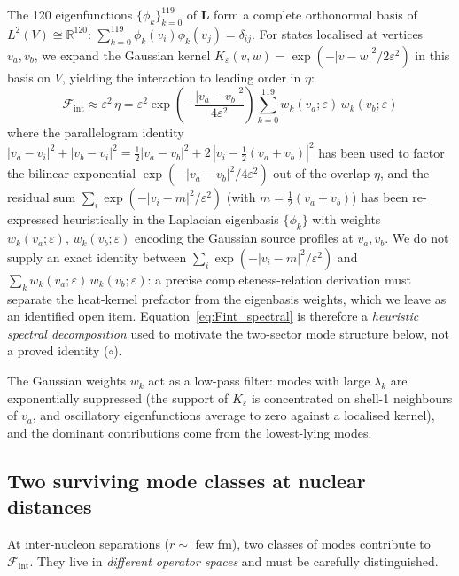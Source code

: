 \documentclass[12pt]{article}
\newcommand{\Fcal}{\mathcal{F}}
\newcommand{\Fint}{\Fcal_{\mathrm{int}}}
\begin{document}
The 120 eigenfunctions $\{\phi_k\}_{k=0}^{119}$ of $\mathbf{L}$ form a
complete orthonormal basis of $L^2(V) \cong \mathbb{R}^{120}$:
$\sum_{k=0}^{119} \phi_k(v_i)\phi_k(v_j) = \delta_{ij}$. For states
localised at vertices $v_a, v_b$, we expand the Gaussian kernel
$K_\varepsilon(v,w) = \exp(-|v-w|^2/2\varepsilon^2)$ in this basis on
$V$, yielding the interaction to leading order in $\eta$:
\begin{equation}\label{eq:Fint_spectral}
    \Fint \approx \varepsilon^2\,\eta =
    \varepsilon^2\exp\!\left(-\frac{|v_a - v_b|^2}{4\varepsilon^2}\right)
    \sum_{k=0}^{119} w_k(v_a;\varepsilon)\,w_k(v_b;\varepsilon)
\end{equation}
where the parallelogram identity $|v_a - v_i|^2 + |v_b - v_i|^2 = \tfrac{1}{2}|v_a - v_b|^2 + 2\,|v_i - \tfrac{1}{2}(v_a+v_b)|^2$ has been used to factor the bilinear exponential $\exp(-|v_a - v_b|^2/4\varepsilon^2)$ out of the overlap $\eta$, and the residual sum $\sum_i \exp(-|v_i - m|^2/\varepsilon^2)$ (with $m = \tfrac{1}{2}(v_a+v_b)$) has been re-expressed heuristically in the Laplacian eigenbasis $\{\phi_k\}$ with weights $w_k(v_a;\varepsilon),\,w_k(v_b;\varepsilon)$ encoding the Gaussian source profiles at $v_a, v_b$. We do not supply an exact identity between $\sum_i \exp(-|v_i - m|^2/\varepsilon^2)$ and $\sum_k w_k(v_a;\varepsilon)\,w_k(v_b;\varepsilon)$: a precise completeness-relation derivation must separate the heat-kernel prefactor from the eigenbasis weights, which we leave as an identified open item. Equation~\eqref{eq:Fint_spectral} is therefore a \emph{heuristic spectral decomposition} used to motivate the two-sector mode structure below, not a proved identity ($\circ$).

The Gaussian weights $w_k$ act as a low-pass filter: modes with large
$\lambda_k$ are exponentially suppressed (the support of
$K_\varepsilon$ is concentrated on shell-1 neighbours of $v_a$, and
oscillatory eigenfunctions average to zero against a localised kernel),
and the dominant contributions come from the lowest-lying modes.

\subsection{Two surviving mode classes at nuclear distances}\label{sec:two_modes}

At inter-nucleon separations ($r \sim$ few fm), two classes of modes
contribute to $\Fint$. They live in \textit{different operator spaces}
and must be carefully distinguished.
\end{document}
